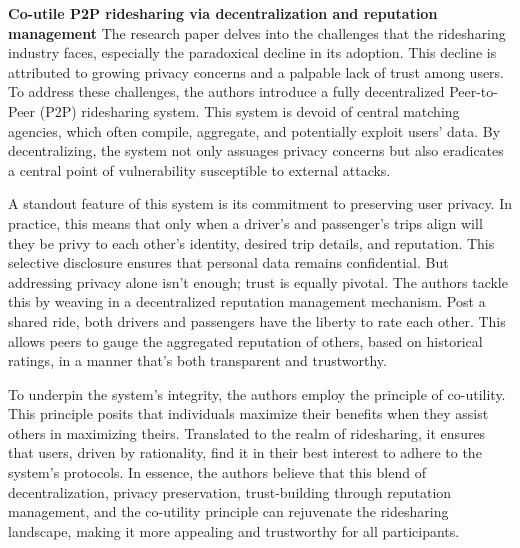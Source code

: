 \textbf{Co-utile P2P ridesharing via decentralization and reputation management}
The research paper delves into the challenges that the ridesharing industry faces, especially the paradoxical decline in its adoption. This decline is attributed to growing privacy concerns and a palpable lack of trust among users. To address these challenges, the authors introduce a fully decentralized Peer-to-Peer (P2P) ridesharing system. This system is devoid of central matching agencies, which often compile, aggregate, and potentially exploit users' data. By decentralizing, the system not only assuages privacy concerns but also eradicates a central point of vulnerability susceptible to external attacks.

A standout feature of this system is its commitment to preserving user privacy. In practice, this means that only when a driver's and passenger's trips align will they be privy to each other's identity, desired trip details, and reputation. This selective disclosure ensures that personal data remains confidential. But addressing privacy alone isn't enough; trust is equally pivotal. The authors tackle this by weaving in a decentralized reputation management mechanism. Post a shared ride, both drivers and passengers have the liberty to rate each other. This allows peers to gauge the aggregated reputation of others, based on historical ratings, in a manner that's both transparent and trustworthy.

To underpin the system's integrity, the authors employ the principle of co-utility. This principle posits that individuals maximize their benefits when they assist others in maximizing theirs. Translated to the realm of ridesharing, it ensures that users, driven by rationality, find it in their best interest to adhere to the system's protocols. In essence, the authors believe that this blend of decentralization, privacy preservation, trust-building through reputation management, and the co-utility principle can rejuvenate the ridesharing landscape, making it more appealing and trustworthy for all participants.

